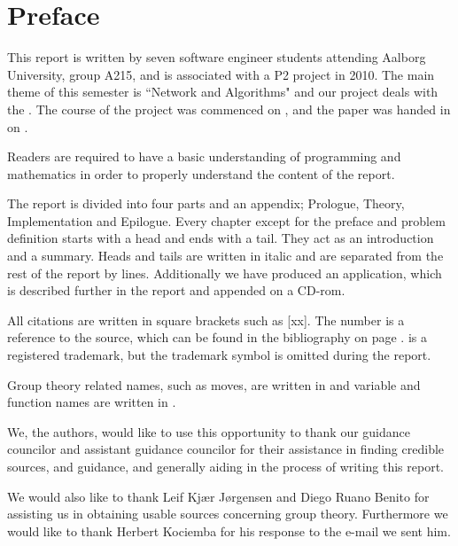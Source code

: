 \chapter*{Preface}
%
\emptyTop{}%
\vspace{-15mm}%
This report is written by seven software engineer students attending Aalborg University, group A215, and is associated with a P2 project in 2010.
The main theme of this semester is ``Network and Algorithms" and our project deals with the \rubik{}.
The course of the project was commenced on , and the paper was handed in on .

Readers are required to have a basic understanding of programming and mathematics in order to properly understand the content of the report. 

The report is divided into four parts and an appendix; Prologue, Theory, Implementation and Epilogue. Every chapter except for the preface and problem definition starts with a head and ends with a tail. They act as an introduction and a summary. Heads and tails are written in italic and are separated from the rest of the report by lines. 
Additionally we have produced an application, which is described further in the report and appended on a CD-rom.

All citations are written in square brackets such as [xx]. The number is a reference to the source, which can be found in the bibliography on page \pageref{chap:bib}. 
\rubik{} is a registered trademark, but the trademark symbol is omitted during the report.


Group theory related names, such as moves, are written in  and variable and function names are written in .

We, the authors, would like to use this opportunity to thank our guidance councilor and assistant guidance councilor for their assistance in finding credible sources, and guidance, and generally aiding in the process of writing this report. 

We would also like to thank Leif Kj\ae{}r J\o{}rgensen and Diego Ruano Benito for assisting us in obtaining usable sources concerning group theory.
Furthermore we would like to thank Herbert Kociemba for his response to the e-mail we sent him.
